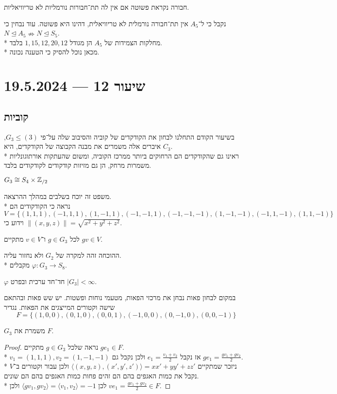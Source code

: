 \begin{definition}
	חבורה נקראת פשוטה אם אין לה תת־חבורות נורמליות לא טריוויאליות.
\end{definition}
נקבל כי ל־$A_5$ אין תת־חבורה נורמלית לא טריוויאלית, דהינו היא פשוטה.
עוד נבחין כי $N \trianglelefteq A_5 \nRightarrow N \trianglelefteq S_5$. \\*
מחלקות הצמידות של $A_5$ הן מגודל $1, 15, 12, 20, 12$ בלבד. \\*
מכאן נוכל להסיק כי הטענה נכונה.

\section{שיעור 12 --- 19.5.2024}
\subsection{קוביות}
בשיעור הקודם התחלנו לבחון את הקודקדים של קוביה והסיבוב שלה על־פי $G_3 \le (3)$,
איברים אלה משמרים את מבנה הקבוצה של הקודקדים, היא $C_3$. \\*
ראינו גם שהקודקדים הם הרחוקים ביותר ממרכז הקוביה, ומשום שהעתקות אורתוגונליות משמרות מרחק, הן גם מזיזות קודקודים לקודקודים בלבד.
\begin{theorem}
	$G_3 \cong S_4 \times \mathbb{Z}_{/2}$
\end{theorem}
משפט זה יוכח בשלבים במהלך ההרצאה. \\*
נראה כי הקודקודים הם
\[
	V = \{ (1, 1, 1), (-1, 1, 1), (1, -1, 1), (-1, -1, 1), (-1, -1, -1), (1, -1, -1), (-1, 1, -1), (1, 1, -1) \}
\]
וידוע כי $\lVert (x, y, z) \rVert = \sqrt{x^2 + y^2 + z^2}$.
\begin{lemma}
	לכל $g \in G_3$ ו־$v \in V$ מתקיים $gv \in V$.
\end{lemma}
ההוכחה זהה למקרה של $G_2$ ולא נחזור עליה. \\*
מקבלים $\varphi : G_3 \to S_8$.
\begin{lemma}
	$\varphi$ חד־חד ערכית ובפרט $|G_3| < \infty$.
\end{lemma}
במקום לבחון פאות נבחן את מרכזי הפאות, מטעמי נוחות ופשטות.
יש שש פאות ובהתאם שישה וקטורים המייצגים את הפאות. נגדיר
\[
	F = \{ (1, 0, 0), (0, 1, 0), (0, 0, 1), (-1, 0, 0), (0, -1, 0), (0, 0, -1) \}
\]
\begin{lemma}
	$G_3$ משמרת את $F$.
\end{lemma}
\begin{proof}
	נראה שלכל $g \in G_3$ מתקיים $ge_1 \in F$. \\*
	$v_1 = (1, 1, 1), v_2 = (1, -1, -1)$ אז נקבל $e_1 = \frac{v_1 + v_2}{2}$ ולכן נקבל גם $g e_1 = \frac{gv_1 + gv_2}{2}$. \\*
	ניזכר שמתקיים $\langle (x, y, z), (x', y', z') \rangle = xx' + yy' + zz'$ ולכן עבור וקטורים ב־$V$ נקבל את כמות האגפים בהם הם זהים פחות כמות האגפים בהם הם שונים. \\*
	לכן $\langle gv_1, gv_2 \rangle = \langle v_1, v_2 \rangle = -1$ ולכן $ve_1 = \frac{gv_1 + gv_2}{2} \in F$.
\end{proof}
